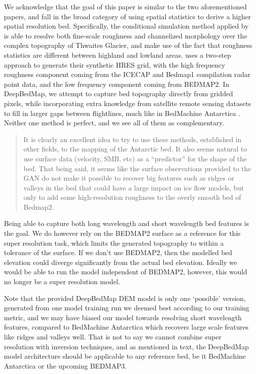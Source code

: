 We acknowledge that the goal of this paper is similar to the two aforementioned papers, and fall in the broad category of using spatial statistics to derive a higher spatial resolution bed.
Specifically, the conditional simulation method applied by \citet{GoffConditionalsimulationThwaites2014} is able to resolve both fine-scale roughness and channelized morphology over the complex topography of Thwaites Glacier, and make use of the fact that roughness statistics are different between highland and lowland areas.
\citet{Grahamhighresolutionsyntheticbed2017} uses a two-step approach to generate their synthetic HRES grid, with the high frequency roughness component coming from the ICECAP and Bedmap1 compilation radar point data, and the low frequency component coming from BEDMAP2.
In DeepBedMap, we attempt to capture bed topography directly from gridded pixels,  while incorporating extra knowledge from satellite remote sensing datasets to fill in larger gaps between flightlines, much like in BedMachine Antarctica \citep{MorlighemDeepglacialtroughs2019}.
Neither one method is perfect, and we see all of them as complementary.


\begin{quote}
\color{blue}
  It is clearly an excellent idea to try to use these methods, established in other fields, to the mapping of the Antarctic bed.
  It also seems natural to use surface data (velocity, SMB, etc) as a “predictor” for the shape of the bed.
  That being said, it seems like the surface observations provided to the GAN do not make it possible to recover big features such as ridges or valleys in the bed that could have a large impact on ice flow models, but only to add some high-resolution roughness to the overly smooth bed of Bedmap2.
\end{quote}

Being able to capture both long wavelength and short wavelength bed features is the goal.
We do however rely on the BEDMAP2 surface as a reference for this super resolution task, which limits the generated topography to within a tolerance of the surface.
If we don't use BEDMAP2, then the modelled bed elevation could diverge significantly from the actual bed elevation.
Ideally we would be able to run the model independent of BEDMAP2, however, this would no longer be a super resolution model.

Note that the provided DeepBedMap DEM model is only one `possible' version, generated from one model training run we deemed best according to our training metric, and we may have biased our model towards resolving short wavelength features, compared to BedMachine Antarctica which recovers large scale features like ridges and valleys well.
That is not to say we cannot combine super resolution with inversion techniques, and as mentioned in text, the DeepBedMap model architecture should be applicable to any reference bed, be it BedMachine Antarctica or the upcoming BEDMAP3.

